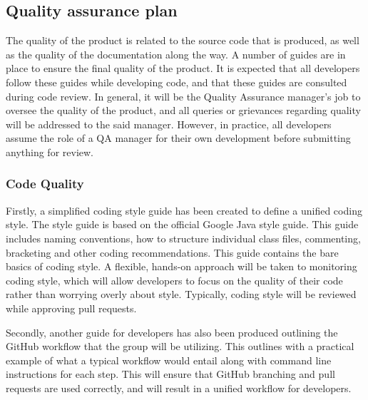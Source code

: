 \documentclass{article}
\begin{document}
\subsection{Quality assurance plan}
\begin{adjustwidth}{1em}{0pt}
The quality of the product is related to the source code that is produced, as well as the quality of the documentation along the way. A number of guides are in place to ensure the final quality of the product. It is expected that all developers follow these guides while developing code, and that these guides are consulted during code review. In general, it will be the Quality Assurance manager's job to oversee the quality of the product, and all queries or grievances regarding quality will be addressed to the said manager. However, in practice, all developers assume the role of a QA manager for their own development before submitting anything for review.

\subsubsection{Code Quality}
\begin{adjustwidth}{1em}{0pt}
Firstly, a simplified coding style guide has been created to define a unified coding style. The style guide is based on the official Google Java style guide. This guide includes naming conventions, how to structure individual class files, commenting, bracketing and other coding recommendations. This guide contains the bare basics of coding style. A flexible, hands-on approach will be taken to monitoring coding style, which will allow developers to focus on the quality of their code rather than worrying overly about style. Typically, coding style will be reviewed while approving pull requests.

Secondly, another guide for developers has also been produced outlining the GitHub workflow that the group will be utilizing. This outlines with a practical example of what a typical workflow would entail along with command line instructions for each step. This will ensure that GitHub branching and pull requests are used correctly, and will result in a unified workflow for developers.
\end{adjustwidth}


\end{adjustwidth}
\end{document}
